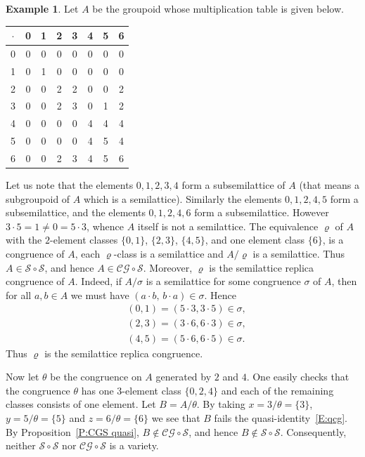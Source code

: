 \documentclass{birkau}
\newcommand{\mc}{\mathcal}
\newcommand{\mcS}{\mathcal{S}}
\theoremstyle{plain}
\theoremstyle{definition}
\newtheorem{example}[theorem]{Example}
\numberwithin{equation}{section}
\begin{document}
\begin{example}\label{Ex:SS}
Let $A$ be the groupoid whose multiplication table is given below.
\begin{center}
    \begin{tabular}{c|ccccccc}
   $\cdot$ &0&1&2&3&4&5&6\\
    \hline
    0& 0 & 0 & 0 & 0 & 0 & 0 & 0\\
    1& 0 & 1 & 0 & 0 & 0 & 0 & 0\\
    2& 0 & 0 & 2 & 2 & 0 & 0 & 2\\
    3& 0 & 0 & 2 & 3 & 0 & 1 & 2\\
    4& 0 & 0 & 0 & 0 & 4 & 4 & 4\\
    5& 0 & 0 & 0 & 0 & 4 & 5 & 4\\
    6& 0 & 0 & 2 & 3 & 4 & 5 & 6\\
    \end{tabular}
\end{center}
Let us note that the elements $0, 1, 2, 3, 4$ form a subsemilattice of $A$ (that means a
subgroupoid of $A$ which is a semilattice). Similarly the elements $0, 1, 2, 4, 5$ form a
subsemilattice, and the elements $0, 1, 2, 4, 6$ form a subsemilattice. However $3 \cdot 5
= 1 \neq 0 = 5 \cdot 3$, whence $A$ itself is not a semilattice. The equivalence $\varrho$
of $A$ with the $2$-element  classes $\{0, 1\}$, $\{2, 3\}$, $\{4, 5\}$, and one element
class $\{6\}$, is a congruence of $A$, each $\varrho$-class is a semilattice and
$A/\varrho$ is a semilattice. Thus $A \in \mathcal S \circ \mathcal S$, and hence $A \in
\mc{CG} \circ \mcS$.
Moreover, $\varrho$ is the semilattice replica congruence of $A$. Indeed, if $A/\sigma$ is
a semilattice for some congruence $\sigma$ of $A$, then for all $a, b \in A$ we must have
$(a \cdot b, \, b \cdot a) \in \sigma$. Hence
\begin{align*}
&(0, 1) = (5 \cdot 3, 3 \cdot 5) \in \sigma,\\
&(2, 3) = (3 \cdot 6, 6 \cdot 3) \in \sigma,\\
&(4, 5) = (5 \cdot 6, 6 \cdot 5) \in \sigma.
\end{align*}
Thus $\varrho$ is the semilattice replica congruence.

Now let $\theta$ be the congruence on $A$ generated by $2$ and $4$. One easily checks
that the congruence $\theta$ has one $3$-element class $\{0, 2, 4\}$ and each of the
remaining classes consists of one element. Let $B =A/\theta$.
By taking
$x=3/\theta=\{3\}$, $y= 5/\theta=\{5\}$ and $z=6/\theta = \{6\}$ we see that $B$ fails the
quasi-identity~\eqref{E:qcg}. By Proposition~\ref{P:CGS quasi}, $B \notin \mc{CG} \circ
\mcS$, and hence $B \notin \mcS \circ \mcS$. Consequently, neither $\mcS \circ \mcS$ nor
$\mc{CG} \circ \mcS$ is a variety.
\end{example}
\end{document}
